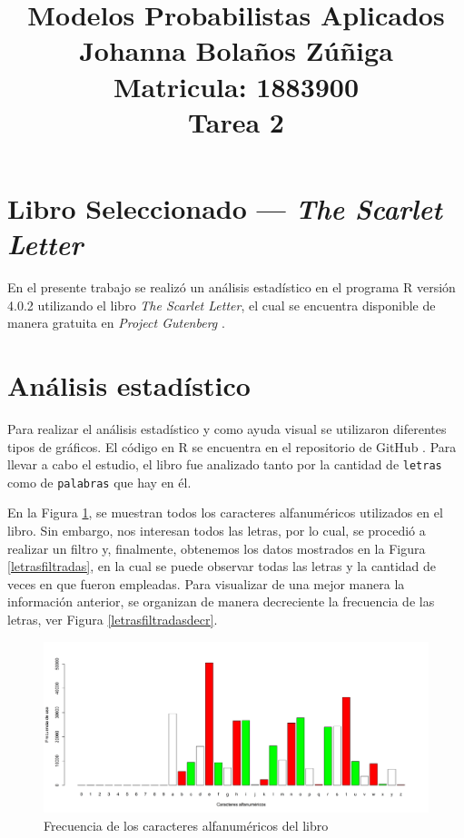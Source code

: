 \documentclass{article}
\title{
\centering
Modelos Probabilistas Aplicados \\
Johanna Bolaños Zúñiga \\
Matricula: 1883900\\
Tarea 2
}
\date{}
\begin{document}
\maketitle

\section{Libro Seleccionado --- \textit{The Scarlet Letter}}

En el presente trabajo se realizó un análisis estadístico en el programa R versión 4.0.2 \cite{r} utilizando el libro \textit{The Scarlet Letter}, el cual se encuentra disponible de manera gratuita en \textit{Project Gutenberg} \cite{libro}.

\section{Análisis estadístico}
Para realizar el análisis estadístico y como ayuda visual se utilizaron diferentes tipos de gráficos. El código en R se encuentra en el repositorio de GitHub \cite{github}. Para llevar a cabo el estudio, el libro fue analizado tanto por la cantidad de \texttt{letras} como de \texttt{palabras} que hay en él.

En la Figura \ref{letras}, se muestran todos los caracteres alfanuméricos utilizados en el libro. Sin embargo, nos interesan todos las letras, por lo cual, se procedió a realizar un filtro y, finalmente, obtenemos los datos mostrados en la Figura \ref{letrasfiltradas}, en la cual se puede observar todas las letras y la cantidad de veces en que fueron empleadas. Para visualizar de una mejor manera la información anterior, se organizan de manera decreciente la frecuencia de las letras, ver Figura \ref{letrasfiltradasdecr}. 

\begin{figure}
\centering
\includegraphics[scale=0.45]{Figures/letrasEnElTexto.png}
\caption{Frecuencia de los caracteres alfanuméricos del libro}
\label{letras}
\end{figure}
\end{document}
